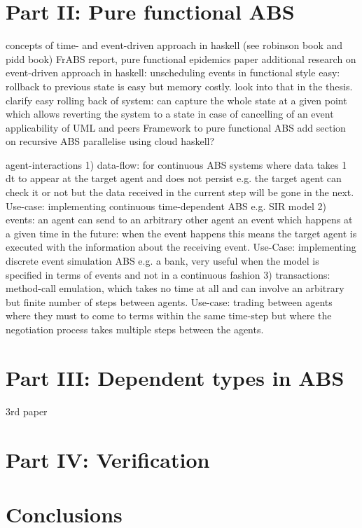 \documentclass[oneside]{book}
\begin{document}
\chapter{Part II: Pure functional ABS}
concepts of time- and event-driven approach in haskell (see robinson book and pidd book)
FrABS report,
pure functional epidemics paper
additional research on event-driven approach in haskell: unscheduling events in functional style easy: rollback to previous state is easy but memory costly. look into that in the thesis. clarify easy rolling back of system: can capture the whole state at a given point which allows reverting the system to a state in case of cancelling of an event
applicability of UML and peers Framework to pure functional ABS 
add section on recursive ABS
parallelise using cloud haskell?

agent-interactions
1) data-flow: for continuous ABS systems where data takes 1 dt to appear at the target agent and does not persist e.g. the target agent can check it or not but the data received in the current step will be gone in the next. Use-case: implementing continuous time-dependent ABS e.g. SIR model
2) events: an agent can send to an arbitrary other agent an event which happens at a given time in the future: when the event happens this means the target agent is executed with the information about the receiving event. Use-Case: implementing discrete event simulation ABS e.g. a bank, very useful when the model is specified in terms of events and not in a continuous fashion
3) transactions: method-call emulation, which takes no time at all and can involve an arbitrary but finite number of steps between agents. Use-case: trading between agents where they must to come to terms within the same time-step but where the negotiation process takes multiple steps between the agents.

\chapter{Part III: Dependent types in ABS}
3rd paper

\chapter{Part IV: Verification}

\chapter{Conclusions}



\end{document}
